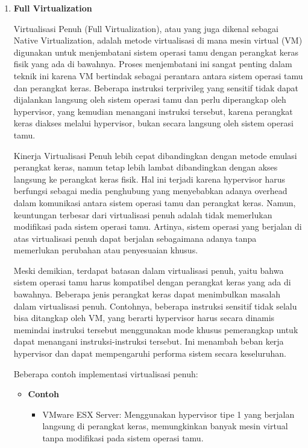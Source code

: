 \documentclass[12pt]{article}
\begin{document}
\begin{enumerate}
    \item \textbf{Full Virtualization}
    \par Virtualisasi Penuh (Full Virtualization), atau yang juga dikenal sebagai Native Virtualization, adalah metode virtualisasi di mana mesin virtual (VM) digunakan untuk menjembatani sistem operasi tamu dengan perangkat keras fisik yang ada di bawahnya. Proses menjembatani ini sangat penting dalam teknik ini karena VM bertindak sebagai perantara antara sistem operasi tamu dan perangkat keras. Beberapa instruksi terprivileg yang sensitif tidak dapat dijalankan langsung oleh sistem operasi tamu dan perlu diperangkap oleh hypervisor, yang kemudian menangani instruksi tersebut, karena perangkat keras diakses melalui hypervisor, bukan secara langsung oleh sistem operasi tamu.
    
    \par Kinerja Virtualisasi Penuh lebih cepat dibandingkan dengan metode emulasi perangkat keras, namun tetap lebih lambat dibandingkan dengan akses langsung ke perangkat keras fisik. Hal ini terjadi karena hypervisor harus berfungsi sebagai media penghubung yang menyebabkan adanya overhead dalam komunikasi antara sistem operasi tamu dan perangkat keras. Namun, keuntungan terbesar dari virtualisasi penuh adalah tidak memerlukan modifikasi pada sistem operasi tamu. Artinya, sistem operasi yang berjalan di atas virtualisasi penuh dapat berjalan sebagaimana adanya tanpa memerlukan perubahan atau penyesuaian khusus.
    
    \par Meski demikian, terdapat batasan dalam virtualisasi penuh, yaitu bahwa sistem operasi tamu harus kompatibel dengan perangkat keras yang ada di bawahnya. Beberapa jenis perangkat keras dapat menimbulkan masalah dalam virtualisasi penuh. Contohnya, beberapa instruksi sensitif tidak selalu bisa ditangkap oleh VM, yang berarti hypervisor harus secara dinamis memindai instruksi tersebut menggunakan mode khusus pemerangkap untuk dapat menangani instruksi-instruksi tersebut. Ini menambah beban kerja hypervisor dan dapat mempengaruhi performa sistem secara keseluruhan.
    
    \par Beberapa contoh implementasi virtualisasi penuh:
    \begin{itemize}
        \item \textbf{Contoh}
        \begin{itemize}
            \item VMware ESX Server: Menggunakan hypervisor tipe 1 yang berjalan langsung di perangkat keras, memungkinkan banyak mesin virtual tanpa modifikasi pada sistem operasi tamu.
    

\end{itemize}
\end{itemize}
\end{enumerate}
\end{document}
